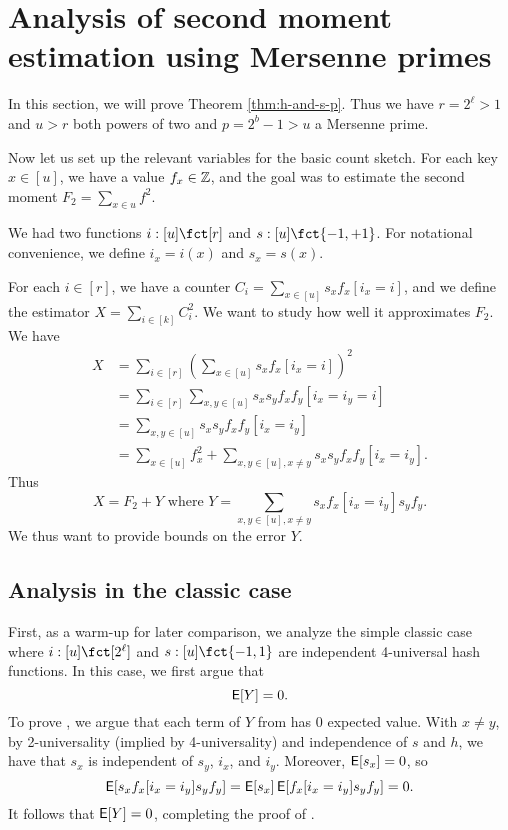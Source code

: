 


\section{Analysis of second moment estimation using  Mersenne primes}\label{sec:analysis-two-for-one}
In this section, we will prove Theorem \ref{thm:h-and-s-p}.  Thus we
have $r=2^\ell>1$ and $u>r$ both powers of two and $p=2^b-1>u$ a
Mersenne prime.

Now let us set up the relevant variables for the basic count sketch.
For each key $x\in [u]$, we have a value $f_x\in \mathbb Z$, and the
goal was to estimate the second moment $F_2=\sum_{x\in u}f^2$.

We had two functions $i:[u]\fct[r]$ and $s:[u]\fct\{-1,+1\}$. 
For notational convenience, we define $i_x=i(x)$ and $s_x=s(x)$.

For each $i\in [r]$, we have a counter 
$C_i=\sum_{x\in[u]} s_x f_x[i_x=i]$, and we define the 
estimator $X=\sum_{i\in[k]} C_i^2$. We want to study how
well it approximates $F_2$.
We have 
\begin{align*}
X&=\sum_{i\in[r]}\left( \sum_{x\in[u]}s_x f_x[i_x=i]\right)^2\\
&=\sum_{i\in[r]}\sum_{x,y\in[u]}s_x s_y f_x f_y [i_x = i_y = i]\\
&=\sum_{x,y\in[u]}s_x s_y f_x f_y[i_x=i_y]\\
&=\sum_{x\in[u]} f_x^2+\sum_{x,y\in[u],x\neq y} s_x s_y f_x f_y[i_x=i_y] .
\end{align*}
Thus 
\begin{equation}\label{eq:decomp}
X=F_2+Y\mbox{ where }Y=\sum_{x,y\in[u],x\neq y}
s_x f_x[i_x=i_y]s_y f_y.
\end{equation}
We thus want to provide bounds on the error $Y$.

\subsection{Analysis in the classic case}
First, as a warm-up for later comparison, we analyze the simple classic case
where $i:[u]\fct[2^\ell]$ and
$s:[u]\fct\{-1,1\}$ are independent 4-universal hash
functions. In this case, we first argue that 
\begin{equation}\label{eq:mean}
\operatorname*{\sf{E}}[Y]=0.
\end{equation}
To prove , we argue that each term of
$Y$ from  has 0 expected value. With $x\neq y$, by 2-universality (implied by 4-universality) and independence of $s$ and $h$, we have that $s_x$ is independent of $s_y$, $i_x$, and $i_y$.
Moreover, $\operatorname*{\sf{E}}[s_x]=0$, 
so 
\[\operatorname*{\sf{E}}[s_x f_x[i_x=i_y]s_y f_y]=\operatorname*{\sf{E}}[s_x]\operatorname*{\sf{E}}[f_x[i_x=i_y]s_y f_y]=0.\]
It follows that $\operatorname*{\sf{E}}[Y]=0$, completing the proof of .

